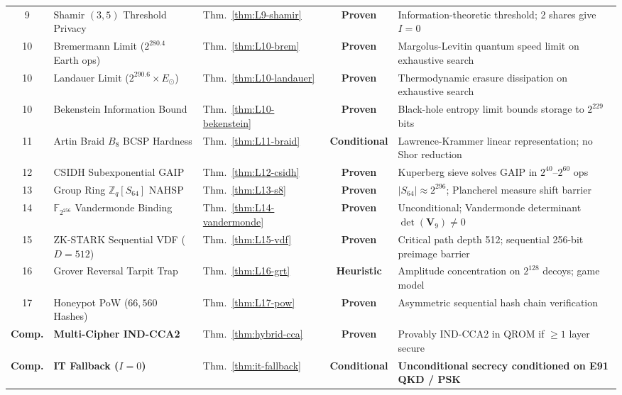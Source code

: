 \documentclass{ieeeaccess}
\newcommand{\Z}{\mathbb{Z}}
\newcommand{\F}{\mathbb{F}}
\newcommand{\bfV}{\mathbf{V}}
\begin{document}
\begin{table}[!t]
\begin{tabular}{@{}c p{4.6cm} p{3.6cm} c p{5.0cm}@{}}
9  & Shamir $(3,5)$ Threshold Privacy    & Thm.~\ref{thm:L9-shamir} & \textbf{Proven}   & Information-theoretic threshold; 2 shares give $I=0$ \\
10 & Bremermann Limit ($2^{280.4}$ Earth ops) & Thm.~\ref{thm:L10-brem} & \textbf{Proven} & Margolus-Levitin quantum speed limit on exhaustive search \\
10 & Landauer Limit ($2^{290.6} \times E_\odot$) & Thm.~\ref{thm:L10-landauer} & \textbf{Proven} & Thermodynamic erasure dissipation on exhaustive search \\
10 & Bekenstein Information Bound        & Thm.~\ref{thm:L10-bekenstein} & \textbf{Proven} & Black-hole entropy limit bounds storage to $2^{229}$ bits \\
11 & Artin Braid $B_8$ BCSP Hardness     & Thm.~\ref{thm:L11-braid} & \textbf{Conditional} & Lawrence-Krammer linear representation; no Shor reduction \\
12 & CSIDH Subexponential GAIP           & Thm.~\ref{thm:L12-csidh} & \textbf{Proven}      & Kuperberg sieve solves GAIP in $2^{40}$--$2^{60}$ ops \\
13 & Group Ring $\Z_q[S_{64}]$ NAHSP     & Thm.~\ref{thm:L13-s8} & \textbf{Proven}      & $|S_{64}| \approx 2^{296}$; Plancherel measure shift barrier \\
14 & $\F_{2^{256}}$ Vandermonde Binding  & Thm.~\ref{thm:L14-vandermonde} & \textbf{Proven} & Unconditional; Vandermonde determinant $\det(\bfV_9) \neq 0$ \\
15 & ZK-STARK Sequential VDF ($D=512$)   & Thm.~\ref{thm:L15-vdf} & \textbf{Proven}     & Critical path depth 512; sequential 256-bit preimage barrier \\
16 & Grover Reversal Tarpit Trap         & Thm.~\ref{thm:L16-grt} & \textbf{Heuristic}   & Amplitude concentration on $2^{128}$ decoys; game model \\
17 & Honeypot PoW ($66{,}560$ Hashes)    & Thm.~\ref{thm:L17-pow} & \textbf{Proven}     & Asymmetric sequential hash chain verification \\
\midrule
\textbf{Comp.} & \textbf{Multi-Cipher IND-CCA2} & Thm.~\ref{thm:hybrid-cca} & \textbf{Proven} & Provably IND-CCA2 in QROM if $\geq 1$ layer secure \\
\textbf{Comp.} & \textbf{IT Fallback ($I=0$)} & Thm.~\ref{thm:it-fallback} & \textbf{Conditional} & \textbf{Unconditional secrecy conditioned on E91 QKD / PSK} \\
\bottomrule
\end{tabular}
\end{table}
\end{document}
